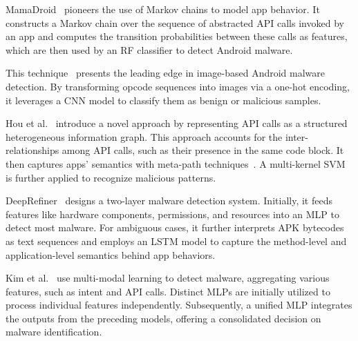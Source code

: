 MamaDroid~\cite{mariconti2016mamadroid} pioneers the use of Markov chains to model app behavior. 
It constructs a Markov chain over the sequence of abstracted API calls invoked by an app and computes the transition probabilities between these calls as features, which are then used by an RF classifier to detect Android malware.

This technique~\cite{mclaughlin2017deep} presents the leading edge in image-based Android malware detection.
By transforming opcode sequences into images via a one-hot encoding, it leverages a CNN model to classify them as benign or malicious samples.

Hou et al.~\cite{hou2017hindroid} introduce a novel approach by representing API calls as a structured heterogeneous information graph.
This approach accounts for the inter-relationships among API calls, such as their presence in the same code block.
It then captures apps' semantics with meta-path techniques~\cite{sun2011pathsim}.
A multi-kernel SVM is further applied to recognize malicious patterns.



DeepRefiner~\cite{xu2018deeprefiner} designs a two-layer malware detection system.
Initially, it feeds features like hardware components, permissions, and resources into an MLP to detect most malware.
For ambiguous cases, it further interprets APK bytecodes as text sequences and employs an LSTM model to capture the method-level and application-level semantics behind app behaviors.

Kim et al.~\cite{kim2018multimodal} use multi-modal learning to detect malware, aggregating various features, such as intent and API calls. 
Distinct MLPs are initially utilized to process individual features independently. 
Subsequently, a unified MLP integrates the outputs from the preceding models, offering a consolidated decision on malware identification.


